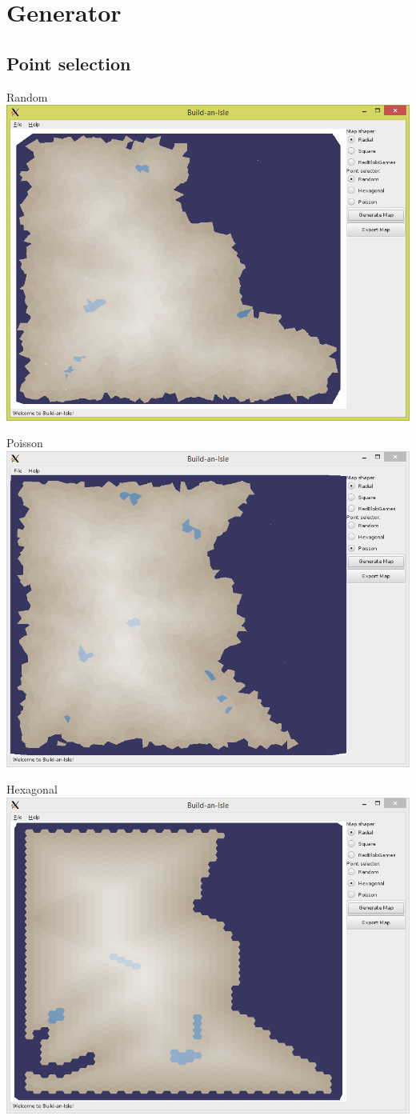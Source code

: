 \documentclass[english,aspectratio=43]{beamer}
\begin{document}
	\section{Generator}
	\subsection{Point selection}
	\begin{frame}{Random}
		\centering
		\includegraphics[width=0.7\linewidth]{random}
	\end{frame}

	\begin{frame}{Poisson}
		\centering
		\includegraphics[width=0.7\linewidth]{poisson}
	\end{frame}

	\begin{frame}{Hexagonal}
		\centering
		\includegraphics[width=0.7\linewidth]{hex}
	\end{frame}
\end{document}
